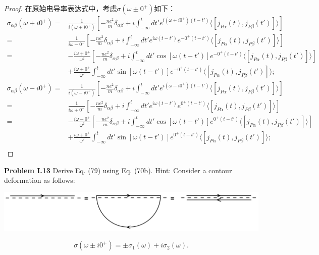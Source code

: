 \documentclass[reqno,a4paper,12pt]{amsart}
\begin{document}
\begin{proof}
在原始电导率表达式中，考虑$\sigma(\omega\pm0^+)$如下：
\begin{align*}
	\sigma_{\alpha\beta}(\omega+i0^+) =& \frac{1}{i(\omega+i0^+)} \left[ -\frac{ne^2}{m}\delta_{\alpha\beta} + i\int_{-\infty}^t dt' e^{i(\omega+i0^+)(t-t')} \langle [j_{P\alpha}(t), j_{P\beta}(t')] \rangle \right] \\
	=& \frac{1}{i\omega-0^+} \left[ -\frac{ne^2}{m}\delta_{\alpha\beta} + i\int_{-\infty}^t dt' e^{i\omega(t-t')} e^{-0^+(t-t')} \langle [j_{P\alpha}(t), j_{P\beta}(t')] \rangle \right] \\
	=& -\frac{i\omega+0^+}{\omega^2} \left[ -\frac{ne^2}{m}\delta_{\alpha\beta} + i\int_{-\infty}^t dt' \cos[\omega(t-t')] e^{-0^+(t-t')} \langle [j_{P\alpha}(t), j_{P\beta}(t')] \rangle \right] \\
	&+ \frac{i\omega+0^+}{\omega^2} \int_{-\infty}^t dt' \sin[\omega(t-t')] e^{-0^+(t-t')} \langle [j_{P\alpha}(t), j_{P\beta}(t')] \rangle; \\
	\sigma_{\alpha\beta}(\omega-i0^+) =& \frac{1}{i(\omega-i0^+)} \left[ -\frac{ne^2}{m}\delta_{\alpha\beta} + i\int_{-\infty}^t dt' e^{i(\omega-i0^+)(t-t')} \langle [j_{P\alpha}(t), j_{P\beta}(t')] \rangle \right]	\\
	=& \frac{1}{i\omega+0^+} \left[ -\frac{ne^2}{m}\delta_{\alpha\beta} + i\int_{-\infty}^t dt' e^{i\omega(t-t')} e^{0^+(t-t')} \langle [j_{P\alpha}(t), j_{P\beta}(t')] \rangle \right] \\
	=& -\frac{i\omega-0^+}{\omega^2} \left[ -\frac{ne^2}{m}\delta_{\alpha\beta} + i\int_{-\infty}^t dt' \cos[\omega(t-t')] e^{0^+(t-t')} \langle [j_{P\alpha}(t), j_{P\beta}(t')] \rangle \right] \\
	&+ \frac{i\omega+0^+}{\omega^2} \int_{-\infty}^t dt' \sin[\omega(t-t')] e^{0^+(t-t')} \langle [j_{P\alpha}(t), j_{P\beta}(t')] \rangle; \\
\end{align*}

\end{proof}


\textbf{Problem I.13} Derive Eq. (79) using Eq. (70b). Hint: Consider a contour deformation as follows:
\begin{center}
	\includegraphics[scale = 0.2]{homework04_P13.jpeg}
\end{center}
\[
	\sigma(\omega\pm i0^+) = \pm \sigma_1(\omega) + i\sigma_2(\omega). \tag{70b}
\]
\end{document}
